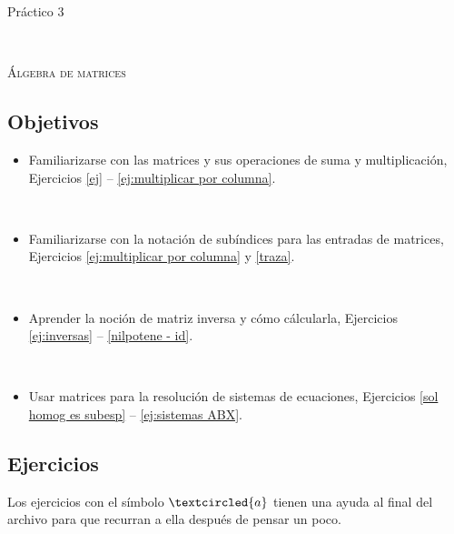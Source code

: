 \documentclass[12pt]{amsart}
\begin{document}



\centerline{\Large{Pr\' actico 3}}

\

\centerline{\textsc{\'Algebra de matrices}}

\subsection*{Objetivos}

\begin{itemize}
 \item Familiarizarse con las matrices y sus operaciones de suma y multiplicaci\'on, Ejercicios \eqref{ej} -- \eqref{ej:multiplicar por columna}.

 \

 \item Familiarizarse con la notaci\'on de sub\'indices para las entradas de matrices, Ejercicios \eqref{ej:multiplicar por columna} y \eqref{traza}.

 \

 \item Aprender la noci\'on de matriz inversa y c\'omo c\'alcularla, Ejercicios \eqref{ej:inversas} -- \eqref{nilpotene - id}.

 \

 \item Usar matrices para la resoluci\'on de sistemas de ecuaciones, Ejercicios \eqref{sol homog es subesp} -- \eqref{ej:sistemas ABX}.
\end{itemize}

\bigbreak

\subsection*{Ejercicios}

Los ejercicios con el s\'imbolo $\textcircled{a}$ tienen una ayuda al final del archivo para que recurran a ella despu\'es de pensar un poco.
\end{document}
